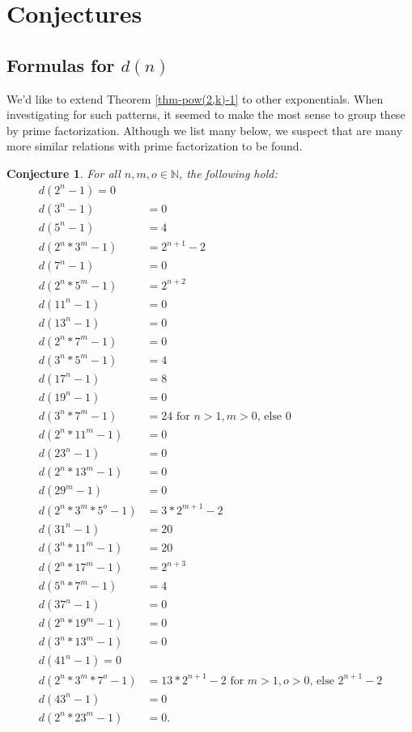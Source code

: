 \documentclass[a4paper]{article}
\newtheorem{conjecture}{Conjecture}
\newcommand{\N}{\mathbb{N}}
\begin{document}
	\section{Conjectures}
	
	\subsection{Formulas for $d(n)$}
	We'd like to extend Theorem \ref{thm-pow(2,k)-1} to other exponentials.
	When investigating for such patterns, it seemed to make the most sense to group these by prime factorization.
	Although we list many below, we suspect that are many more similar relations with prime factorization to be found.
	\begin{conjecture}\label{conj-many-formulas}
		For all $n,m,o \in \N$, the following hold:
		\begin{align*}
			d(2^n - 1) = 0 \\
			d(3^n - 1) &= 0 \\
			d(5^n - 1) &= 4 \\
			d(2^n * 3^m - 1) &= 2^{n+1} - 2 \\
			d(7^n - 1) &= 0 \\
			d(2^n * 5^m - 1) &= 2^{n+2} \\
			d(11^n - 1) &= 0 \\
			d(13^n - 1) &= 0 \\
			d(2^n * 7^m - 1) &= 0 \\
			d(3^n * 5^m - 1) &= 4 \\
			d(17^n - 1) &= 8 \\
			d(19^n - 1) &= 0 \\
			d(3^n * 7^m - 1) &= 24 \text{ for } n > 1, m > 0 \text{, else } 0 \\
			d(2^n * 11^m - 1) &= 0 \\
			d(23^n - 1) &= 0 \\
			d(2^n * 13^m - 1) &= 0 \\
			d(29^m - 1) &= 0 \\
			d(2^n * 3^m * 5^o - 1) &= 3*2^{m+1} - 2 \\
			d(31^n - 1) &= 20 \\
			d(3^n * 11^m - 1) &= 20 \\
			d(2^n * 17^m - 1) &= 2^{n+3} \\
			d(5^n * 7^m - 1) &= 4 \\
			d(37^n - 1) &= 0 \\
			d(2^n * 19^m - 1) &= 0 \\
			d(3^n * 13^m - 1) &= 0 \\
			d(41^n - 1) = 0 \\
			d(2^n * 3^m * 7^o - 1) &= 13*2^{n+1} - 2 \text{ for } m > 1, o > 0\text{, else } 2^{n+1} - 2  \\
			d(43^n - 1) &= 0 \\
			d(2^n * 23^m - 1) &= 0.
		\end{align*}
	\end{conjecture}
\end{document}
